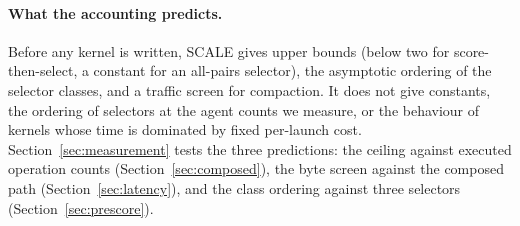 \paragraph{What the accounting predicts.} Before any kernel is written, SCALE
gives upper bounds (below two for score-then-select, a constant for an
all-pairs selector), the asymptotic ordering of the selector classes, and a
traffic screen for compaction. It does not give constants, the ordering of
selectors at the agent counts we measure, or the behaviour of kernels whose
time is dominated by fixed per-launch cost. Section~\ref{sec:measurement}
tests the three predictions: the ceiling against executed operation counts
(Section~\ref{sec:composed}), the byte screen against the composed path
(Section~\ref{sec:latency}), and the class ordering against three selectors
(Section~\ref{sec:prescore}).

